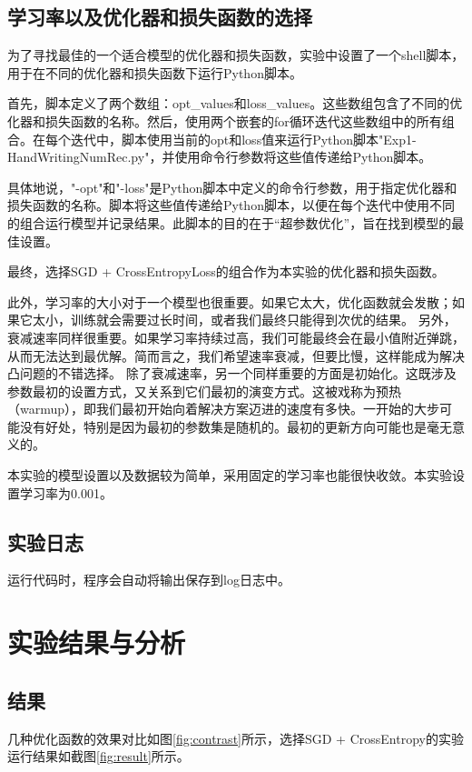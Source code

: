 \documentclass{report}
\begin{document}
	
	\subsection{学习率以及优化器和损失函数的选择}
	为了寻找最佳的一个适合模型的优化器和损失函数，实验中设置了一个shell脚本，用于在不同的优化器和损失函数下运行Python脚本。
	
	首先，脚本定义了两个数组：opt\_values和loss\_values。这些数组包含了不同的优化器和损失函数的名称。然后，使用两个嵌套的for循环迭代这些数组中的所有组合。在每个迭代中，脚本使用当前的opt和loss值来运行Python脚本"Exp1-HandWritingNumRec.py"，并使用命令行参数将这些值传递给Python脚本。
	
	具体地说，"-opt"和"-loss"是Python脚本中定义的命令行参数，用于指定优化器和损失函数的名称。脚本将这些值传递给Python脚本，以便在每个迭代中使用不同的组合运行模型并记录结果。此脚本的目的在于“超参数优化”，旨在找到模型的最佳设置。
	
	最终，选择SGD + CrossEntropyLoss的组合作为本实验的优化器和损失函数。
	
	
	此外，学习率的大小对于一个模型也很重要。如果它太大，优化函数就会发散；如果它太小，训练就会需要过长时间，或者我们最终只能得到次优的结果。
	另外，衰减速率同样很重要。如果学习率持续过高，我们可能最终会在最小值附近弹跳，从而无法达到最优解。简而言之，我们希望速率衰减，但要比慢，这样能成为解决凸问题的不错选择。
	除了衰减速率，另一个同样重要的方面是初始化。这既涉及参数最初的设置方式，又关系到它们最初的演变方式。这被戏称为预热（warmup），即我们最初开始向着解决方案迈进的速度有多快。一开始的大步可能没有好处，特别是因为最初的参数集是随机的。最初的更新方向可能也是毫无意义的。
	
	本实验的模型设置以及数据较为简单，采用固定的学习率也能很快收敛。本实验设置学习率为0.001。
	
	\subsection{实验日志}
	运行代码时，程序会自动将输出保存到log日志中。
	
	\section{实验结果与分析}
	\subsection{结果}
	几种优化函数的效果对比如图\ref{fig:contrast}所示，选择SGD + CrossEntropy的实验运行结果如截图\ref{fig:result}所示。
	
\end{document}

